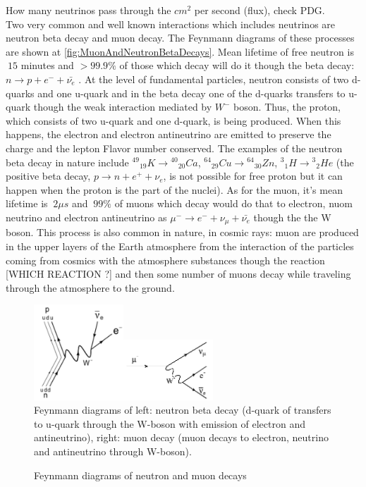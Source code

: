 How many neutrinos pass through the $cm^2$ per second (flux), check PDG.\\
Two very common and well known interactions which includes neutrinos are neutron beta decay and muon decay. The Feynmann diagrams of these processes are shown at \ref{fig:MuonAndNeutronBetaDecays}. Mean lifetime of free neutron is $~15$ minutes and $>99.9\%$ of those which decay will do it though the beta decay: $n \rightarrow p + e^- + \bar{{\nu}_e} $ \cite{ref_PDG}. At the level of fundamental particles, neutron consists of two d-quarks and one u-quark and in the beta decay one of the d-quarks transfers to u-quark though the weak interaction mediated by $W^- $ boson. Thus, the proton, which consists of two u-quark and one d-quark, is being produced. When this happens, the electron and electron antineutrino are emitted to preserve the charge and the lepton Flavor number conserved. The examples of the neutron beta decay in nature include ${^{49}}{_{19}}K \rightarrow {^{40}}{_{20}}Ca$, ${^{64}}{_{29}}Cu \rightarrow {^{64}}{_{30}}Zn$, ${^3}{_1}H \rightarrow {^3}{_2}He$ \cite{ref_Griffiths} (the positive beta decay,  $p \rightarrow n + e^+ + {\nu}_e $, is not possible for free proton but it can happen when the proton is the part of the nuclei). As for the muon, it's mean lifetime is $~2 {\mu}s$ and $~99\%$ of muons which decay would do that to electron, nuom neutrino and electron antineutrino as ${\mu}^- \rightarrow e^- + {\nu}_{\mu} + \bar{{\nu}_e}$ though the the W boson. This process is also common in nature, in cosmic rays: muon are produced in the upper layers of the Earth atmosphere from the interaction of the particles coming from cosmics with the atmosphere substances though the reaction [WHICH REACTION ?] and then some number of muons decay while traveling through the atmosphere to the ground.   

\begin{figure}
\caption{Feynmann diagrams of neutron and muon decays}
\label{fig:MuonAndNeutronDecays}
\centering
\includegraphics[width=0.3\textwidth, keepaspectratio=true]{figs/NeutronBetaDecay.png}\includegraphics[width=0.3\textwidth, keepaspectratio=true]{figs/MuonDecay.png}
\\Feynmann diagrams of left: neutron beta decay \cite{ref_fig_NeutronDecay}(d-quark of transfers to u-quark through the W-boson with emission of electron and antineutrino), right:  muon decay \cite{ref_fig_MuonDecay}(muon decays to electron, neutrino and antineutrino through W-boson).
\end{figure}

